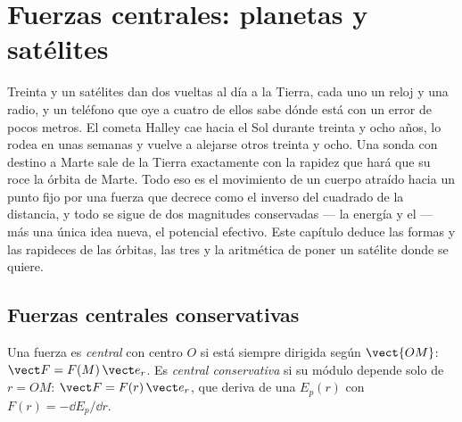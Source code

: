 \chapter{Fuerzas centrales: planetas y satélites}\label{ch:b1:central-forces}

Treinta y un satélites dan dos vueltas al día a la Tierra, cada uno un
reloj y una radio, y un teléfono que oye a cuatro de ellos sabe dónde está
con un error de pocos metros. El cometa Halley cae hacia el Sol durante
treinta y ocho años, lo rodea en unas semanas y vuelve a alejarse otros
treinta y ocho. Una sonda con destino a Marte sale de la Tierra
exactamente con la rapidez que hará que su  roce la órbita de
Marte. Todo eso es el movimiento de un cuerpo atraído hacia un punto fijo
por una fuerza que decrece como el inverso del cuadrado de la distancia, y
todo se sigue de dos magnitudes conservadas --- la energía y el  --- más una única idea nueva, el potencial efectivo. Este capítulo
deduce las formas y las rapideces de las órbitas, las tres 
y la aritmética de poner un satélite donde se quiere.

\section{Fuerzas centrales conservativas}

\begin{definition}\label{def:b1:central-forces:central}
Una fuerza es \emph{central} con centro $O$ si está siempre dirigida según
$\vect{OM}$: $\vect F = F(M)\,\vect e_r$. Es \emph{central conservativa}
si su módulo depende solo de $r = OM$: $\vect F =
F(r)\,\vect e_r$, que deriva de una  $E_p(r)$ con
$F(r) = -\dd E_p/\dd r$.
\end{definition}

